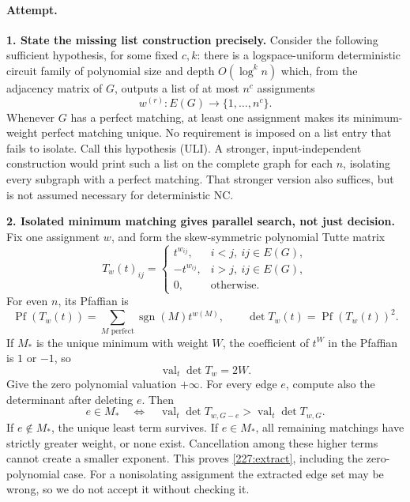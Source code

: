 \documentclass[11pt,a4paper]{article}
\numberwithin{equation}{section}
\begin{document}
\paragraph{Attempt.}
\textbf{1. State the missing list construction precisely.}
Consider the following sufficient hypothesis, for some fixed $c,k$:
there is a logspace-uniform deterministic circuit family of polynomial
size and depth $O(\log^k n)$ which, from the adjacency matrix of $G$,
outputs a list of at most $n^c$ assignments
\[
 w^{(r)}:E(G)\longrightarrow\{1,\ldots,n^c\}.
\]
Whenever $G$ has a perfect matching, at least one assignment makes its
minimum-weight perfect matching unique. No requirement is imposed on a
list entry that fails to isolate. Call this hypothesis (ULI).
A stronger, input-independent construction would print such a list on
the complete graph for each $n$, isolating every subgraph with a perfect
matching. That stronger version also suffices, but is not assumed
necessary for deterministic NC.

\textbf{2. Isolated minimum matching gives parallel search, not just decision.}
Fix one assignment $w$, and form the skew-symmetric polynomial Tutte
matrix
\[
 T_w(t)_{ij}=\begin{cases}
 t^{w_{ij}},&i<j,\ ij\in E(G),\\
 -t^{w_{ij}},&i>j,\ ij\in E(G),\\
 0,&\text{otherwise}.
 \end{cases}
\]
For even $n$, its Pfaffian is
\[
 \operatorname{Pf}(T_w(t))=
    \sum_{M\text{ perfect}}\operatorname{sgn}(M)t^{w(M)},
 \qquad \det T_w(t)=\operatorname{Pf}(T_w(t))^2.
\]
If $M_*$ is the unique minimum with weight $W$, the coefficient of
$t^W$ in the Pfaffian is $1$ or $-1$, so
\begin{equation}\label{227:valuation}
 \operatorname{val}_t\det T_w=2W.
\end{equation}
Give the zero polynomial valuation $+\infty$. For every edge $e$,
compute also the determinant after deleting $e$. Then
\begin{equation}\label{227:extract}
 e\in M_*
 \quad\Longleftrightarrow\quad
 \operatorname{val}_t\det T_{w,G-e}>\operatorname{val}_t\det T_{w,G}.
\end{equation}
If $e\notin M_*$, the unique least term survives. If $e\in M_*$,
all remaining matchings have strictly greater weight, or none exist.
Cancellation among these higher terms cannot create a smaller exponent.
This proves \eqref{227:extract}, including the zero-polynomial case.
For a nonisolating assignment the extracted edge set may be wrong, so
we do not accept it without checking it.
\end{document}
